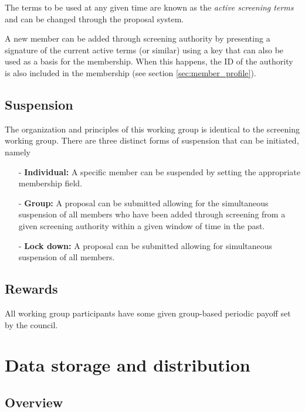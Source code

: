 \documentclass{article}
\begin{document}
The terms to be used at any given time are known as the \textit{active screening terms} and can be changed through the proposal system.

A new member can be added through screening authority by presenting a signature of the current active terms (or similar) using a key that can also be used as a basis for the membership. When this happens, the ID of the authority is also included in the membership (see section \ref{sec:member_profile}).

\subsection{Suspension} \label{sec:suspension}

The organization and principles of this working group is identical to the screening working group. There are three distinct forms of suspension that can be initiated, namely

\begin{itemize}
  \item[-] \textbf{Individual:} A specific member can be suspended by setting the appropriate membership field.

  \item[-] \textbf{Group:} A proposal can be submitted allowing for the simultaneous suspension of all members who have been added through screening from a given screening authority within a given window of time in the past.

  \item[-] \textbf{Lock down:} A proposal can be submitted allowing for simultaneous suspension of all members.
\end{itemize}

\subsection{Rewards}

All working group participants have some given group-based periodic payoff set by the council.

\section{Data storage and distribution} \label{sec:data_storage_and_distribution}

\subsection{Overview}
\end{document}
